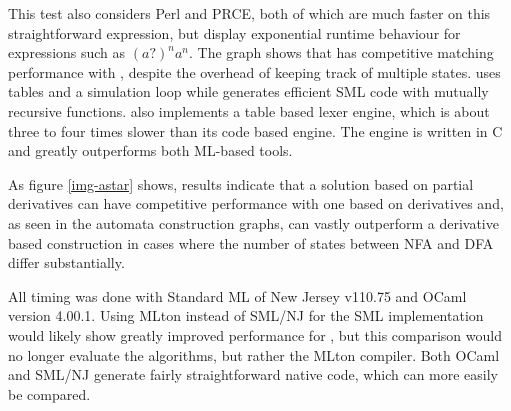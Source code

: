 
This test also considers Perl and PRCE, both of which are much faster on this
straightforward expression, but display exponential runtime behaviour for
expressions such as $(a?)^na^n$. The graph shows that \dreml{} has competitive
matching performance with \mlulex{}, despite the overhead of keeping track of
multiple states. \dreml{} uses tables and a simulation loop while \mlulex{}
generates efficient SML code with mutually recursive functions. \mlulex{} also
implements a table based lexer engine, which is about three to four times slower
than its code based engine. The \ocamllex{} engine is written in C and greatly
outperforms both ML-based tools.

As figure \ref{img-astar} shows, results indicate that a solution based on
partial derivatives can have competitive performance with one based on
derivatives and, as seen in the automata construction graphs, can vastly
outperform a derivative based construction in cases where the number of states
between NFA and DFA differ substantially.

All timing was done with Standard ML of New Jersey v110.75 and OCaml version
4.00.1. Using MLton instead of SML/NJ for the SML implementation would likely
show greatly improved performance for \mlulex, but this comparison would no
longer evaluate the algorithms, but rather the MLton compiler. Both OCaml and
SML/NJ generate fairly straightforward native code, which can more easily be
compared.


